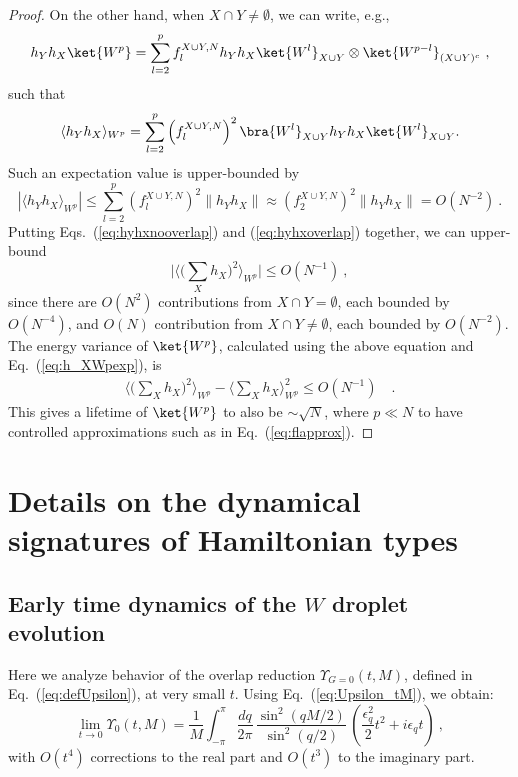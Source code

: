 \documentclass[prx,letterpaper,aps,superscriptaddress,floatfix,twocolumn,nofootinbib]{revtex4-2}
\theoremstyle{definition}
\begin{document}
\begin{proof}
    On the other hand, when $X \cap Y \neq \emptyset$, we can write, e.g., 
    \begin{equation}
        h_Y h_X \ket{W^p} = \sum_{l=2}^p f_l^{X\cup Y,N} h_Y h_X \ket{W^l}_{X\cup Y} \otimes \ket{W^{p-l}}_{(X\cup Y)^c} ~,
    \end{equation}
    such that
    \begin{equation}
        \langle h_Y h_X\rangle_{W^p}=\sum_{l=2}^{p} \left(f_{l}^{X\cup Y,N}\right)^2\bra{W^l}_{X\cup Y}  h_Y h_X\ket{W^l}_{X\cup Y}.
    \end{equation}
    Such an expectation value is upper-bounded by
    \begin{equation}
        |\langle h_Y h_X\rangle_{W^p}| \leq \sum_{l=2}^{p} \left(f_{l}^{X\cup Y,N}\right)^2 \|h_Y h_X\|
        \approx \left(f_{2}^{X\cup Y,N}\right)^2  \|h_Y h_X\| = O(N^{-2}) ~.
        \label{eq:hyhxoverlap}
    \end{equation}
    Putting Eqs.~(\ref{eq:hyhxnooverlap}) and (\ref{eq:hyhxoverlap}) together, we can upper-bound
    \begin{equation}
        \big|\big\langle \big(\sum_X h_X \big)^2\big\rangle_{W^p}\big| \leq O(N^{-1}) ~,
    \end{equation}
    since there are $O(N^2)$ contributions from $X \cap Y = \emptyset$, each bounded by $O(N^{-4})$, and $O(N)$ contribution from $X \cap Y \neq \emptyset$, each bounded by $O(N^{-2})$.
    The energy variance of $\ket{W^p}$, calculated using the above equation and Eq.~(\ref{eq:h_XWpexp}), is
    \begin{align}
        \big\langle \big(\sum_X h_X \big)^2\big\rangle_{W^p}-\big\langle \sum_X h_X \big\rangle_{W^p}^2 \leq O(N^{-1}) \quad.
    \end{align}
    This gives a lifetime of $\ket{W^p}$ to also be $\sim \sqrt{N}$, where $p \ll N$ to have controlled approximations such as in Eq.~(\ref{eq:flapprox}).
\end{proof}

\section{Details on the dynamical signatures of Hamiltonian types}
\label{app:dynamics}
%
\subsection{Early time dynamics of the $W$ droplet evolution} \label{app:earlytime}
%
Here we analyze behavior of the overlap reduction $\Upsilon_{G=0}(t,M)$, defined in Eq.~(\ref{eq:defUpsilon}), at very small $t$.
%
Using Eq.~(\ref{eq:Upsilon_tM}), we obtain:
\begin{equation*}
\lim_{t \to 0} \Upsilon_{0}(t,M) = \frac{1}{M} \int_{-\pi}^\pi \frac{dq}{2\pi} \, \frac{\sin^2(qM/2)}{\sin^2(q/2)} \,\left(\frac{\epsilon_q^2}{2} t^2 + i \epsilon_q t \right) ~,
\end{equation*}
with $O(t^4)$ corrections to the real part and $O(t^3)$ to the imaginary part.
%
\end{document}
